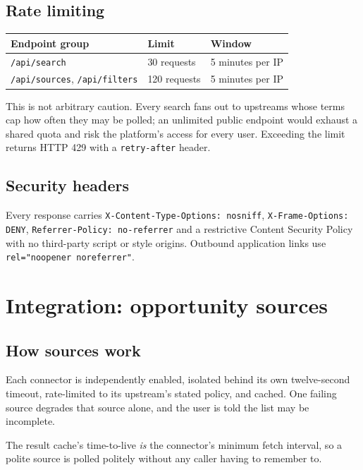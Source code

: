 \documentclass[11pt,a4paper]{report}
\begin{document}
\section{Rate limiting}

\begin{center}
\begin{tabular}{@{}lll@{}}
\toprule
\textbf{Endpoint group} & \textbf{Limit} & \textbf{Window} \\
\midrule
\texttt{/api/search} & 30 requests & 5 minutes per IP \\
\texttt{/api/sources}, \texttt{/api/filters} & 120 requests & 5 minutes per IP \\
\bottomrule
\end{tabular}
\end{center}

This is not arbitrary caution. Every search fans out to upstreams whose terms
cap how often they may be polled; an unlimited public endpoint would exhaust a
shared quota and risk the platform's access for every user. Exceeding the limit
returns HTTP 429 with a \texttt{retry-after} header.

\section{Security headers}

Every response carries \texttt{X-Content-Type-Options: nosniff},
\texttt{X-Frame-Options: DENY}, \texttt{Referrer-Policy: no-referrer} and a
restrictive Content Security Policy with no third-party script or style
origins. Outbound application links use \texttt{rel="noopener noreferrer"}.

\chapter{Integration: opportunity sources}
\label{ch:sources}

\section{How sources work}

Each connector is independently enabled, isolated behind its own twelve-second
timeout, rate-limited to its upstream's stated policy, and cached. One failing
source degrades that source alone, and the user is told the list may be
incomplete.

The result cache's time-to-live \emph{is} the connector's minimum fetch
interval, so a polite source is polled politely without any caller having to
remember to.
\end{document}
